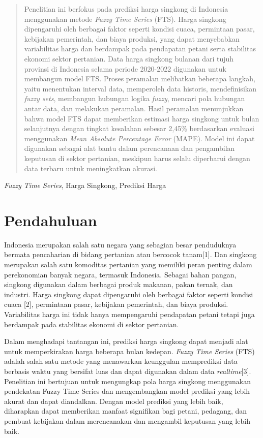 \documentclass[conference]{IEEEtran}
\renewcommand{\headrulewidth}{0pt}
\renewcommand{\footrulewidth}{0.4pt}
\begin{document}
\begin{abstract}
    Penelitian ini berfokus pada prediksi harga singkong di Indonesia menggunakan metode \textit{Fuzzy Time Series} (FTS). Harga singkong dipengaruhi oleh berbagai faktor seperti kondisi cuaca, permintaan pasar, kebijakan pemerintah, dan biaya produksi, yang dapat menyebabkan variabilitas harga dan berdampak pada pendapatan petani serta stabilitas ekonomi sektor pertanian. Data harga singkong bulanan dari tujuh provinsi di Indonesia selama periode 2020-2022 digunakan untuk membangun model FTS. Proses peramalan melibatkan beberapa langkah, yaitu menentukan interval data, memperoleh data historis, mendefinisikan \textit{fuzzy sets}, membangun hubungan logika \textit{fuzzy}, mencari pola hubungan antar data, dan melakukan peramalan. Hasil peramalan menunjukkan bahwa model FTS dapat memberikan estimasi harga singkong untuk bulan selanjutnya dengan tingkat kesalahan sebesar 2,45\% berdasarkan evaluasi menggunakan \textit{Mean Absolute Percentage Error} (MAPE). Model ini dapat digunakan sebagai alat bantu dalam perencanaan dan pengambilan keputusan di sektor pertanian, meskipun harus selalu diperbarui dengan data terbaru untuk meningkatkan akurasi.
\end{abstract}

\begin{IEEEkeywords}
\textit{Fuzzy Time Series}, Harga Singkong, Prediksi Harga
\end{IEEEkeywords}

\thispagestyle{fancy}
\fancyhf{}
\fancyfoot[C]{\thepage}
\renewcommand{\headrulewidth}{0pt}
\renewcommand{\footrulewidth}{0.4pt}
\section{Pendahuluan}
Indonesia merupakan salah satu negara yang sebagian besar penduduknya bermata pencaharian di bidang pertanian atau bercocok tanam[1]. Dan singkong merupakan salah satu komoditas pertanian yang memiliki peran penting dalam perekonomian banyak negara, termasuk Indonesia. Sebagai bahan pangan, singkong digunakan dalam berbagai produk makanan, pakan ternak, dan industri.  Harga singkong dapat dipengaruhi oleh berbagai faktor seperti kondisi cuaca [2], permintaan pasar, kebijakan pemerintah, dan biaya produksi. Variabilitas harga ini tidak hanya mempengaruhi pendapatan petani tetapi juga berdampak pada stabilitas ekonomi di sektor pertanian.

Dalam menghadapi tantangan ini, prediksi harga singkong dapat menjadi alat untuk memperkirakan harga beberapa bulan kedepan. \textit{Fuzzy Time Series} (FTS) adalah salah satu metode yang menawarkan keunggulan memprediksi data berbasis waktu yang bersifat luas dan dapat digunakan dalam data \textit{realtime}[3]. Penelitian ini bertujuan untuk mengungkap pola harga singkong menggunakan pendekatan Fuzzy Time Series dan mengembangkan model prediksi yang lebih akurat dan dapat diandalkan. Dengan model prediksi yang lebih baik, diharapkan dapat memberikan manfaat signifikan bagi petani, pedagang, dan pembuat kebijakan dalam merencanakan dan mengambil keputusan yang lebih baik.
\end{document}
